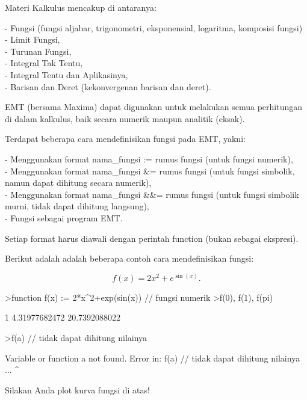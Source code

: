 \documentclass[a4paper,10pt]{article}
\begin{document}
\begin{eulernotebook}
\begin{eulercomment}
Materi Kalkulus mencakup di antaranya:

- Fungsi (fungsi aljabar, trigonometri, eksponensial, logaritma, komposisi fungsi)\\
- Limit Fungsi,\\
- Turunan Fungsi,\\
- Integral Tak Tentu,\\
- Integral Tentu dan Aplikasinya,\\
- Barisan dan Deret (kekonvergenan barisan dan deret).

EMT (bersama Maxima) dapat digunakan untuk melakukan semua perhitungan di dalam kalkulus, baik secara numerik maupun analitik
(eksak).

\end{eulercomment}
\begin{eulercomment}
Terdapat beberapa cara mendefinisikan fungsi pada EMT, yakni:

- Menggunakan format nama\_fungsi := rumus fungsi (untuk fungsi numerik),\\
- Menggunakan format nama\_fungsi \&= rumus fungsi (untuk fungsi simbolik, namun dapat dihitung secara numerik),\\
- Menggunakan format nama\_fungsi \&\&= rumus fungsi (untuk fungsi simbolik murni, tidak dapat dihitung langsung),\\
- Fungsi sebagai program EMT.

Setiap format harus diawali dengan perintah function (bukan sebagai ekspresi).

Berikut adalah adalah beberapa contoh cara mendefinisikan fungsi:

\end{eulercomment}
\begin{eulerformula}
\[
f(x)=2x^2+e^{\sin(x)}.
\]
\end{eulerformula}
\begin{eulerprompt}
>function f(x) := 2*x^2+exp(sin(x)) // fungsi numerik
>f(0), f(1), f(pi)
\end{eulerprompt}
\begin{euleroutput}
  1
  4.31977682472
  20.7392088022
\end{euleroutput}
\begin{eulerprompt}
>f(a) // tidak dapat dihitung nilainya
\end{eulerprompt}
\begin{euleroutput}
  Variable or function a not found.
  Error in:
  f(a) // tidak dapat dihitung nilainya ...
     ^
\end{euleroutput}
\begin{eulercomment}
Silakan Anda plot kurva fungsi di atas!


\end{eulercomment}
\end{eulernotebook}
\end{document}
